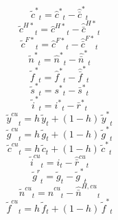 \begin{dmath}
{{\tilde c^*}}_{t}={{\hat c^*}}_{t}-{{\hat {\bar c}^*}}_{t}
\end{dmath}
\begin{dmath}
{{\tilde c^{H*}}}_{t}={{\hat c^{H*}}}_{t}-{{\hat {\bar c}^{H*}}}_{t}
\end{dmath}
\begin{dmath}
{{\tilde c^{F*}}}_{t}={{\hat c^{F*}}}_{t}-{{\hat {\bar c}^{F*}}}_{t}
\end{dmath}
\begin{dmath}
{{\tilde n^*}}_{t}={{\hat n^*}}_{t}-{{\hat {\bar n}^*}}_{t}
\end{dmath}
\begin{dmath}
{{\tilde f^*}}_{t}={{\hat f^*}}_{t}-{{\hat {\bar f}^*}}_{t}
\end{dmath}
\begin{dmath}
{{\tilde s^*}}_{t}={{s^*}}_{t}-{{\bar s^*}}_{t}
\end{dmath}
\begin{dmath}
{{\tilde i^*}}_{t}={{i^*}}_{t}-{{\bar r^*}}_{t}
\end{dmath}
\begin{dmath}
{{\tilde y^{cu}}}_{t}={{h}}\, {{\tilde y}}_{t}+\left(1-{{h}}\right)\, {{\tilde y^*}}_{t}
\end{dmath}
\begin{dmath}
{{\tilde g^{cu}}}_{t}={{h}}\, {{\tilde g}}_{t}+\left(1-{{h}}\right)\, {{\tilde g^*}}_{t}
\end{dmath}
\begin{dmath}
{{\tilde c^{cu}}}_{t}={{h}}\, {{\tilde c}}_{t}+\left(1-{{h}}\right)\, {{\tilde c^*}}_{t}
\end{dmath}
\begin{dmath}
{{\tilde i^{cu}}}_{t}={{i}}_{t}-{{\hat {\bar r}^{cu}}}_{t}
\end{dmath}
\begin{dmath}
{{\tilde g^{r}}}_{t}={{\tilde g}}_{t}-{{\tilde g^*}}_{t}
\end{dmath}
\begin{dmath}
{{\tilde n^{cu}}}_{t}={{\hat n^{cu}}}_{t}-{{\hat {\bar n}^{H,cu}}}_{t}
\end{dmath}
\begin{dmath}
{{\tilde f^{cu}}}_{t}={{h}}\, {{\tilde f}}_{t}+\left(1-{{h}}\right)\, {{\tilde f^*}}_{t}
\end{dmath}

